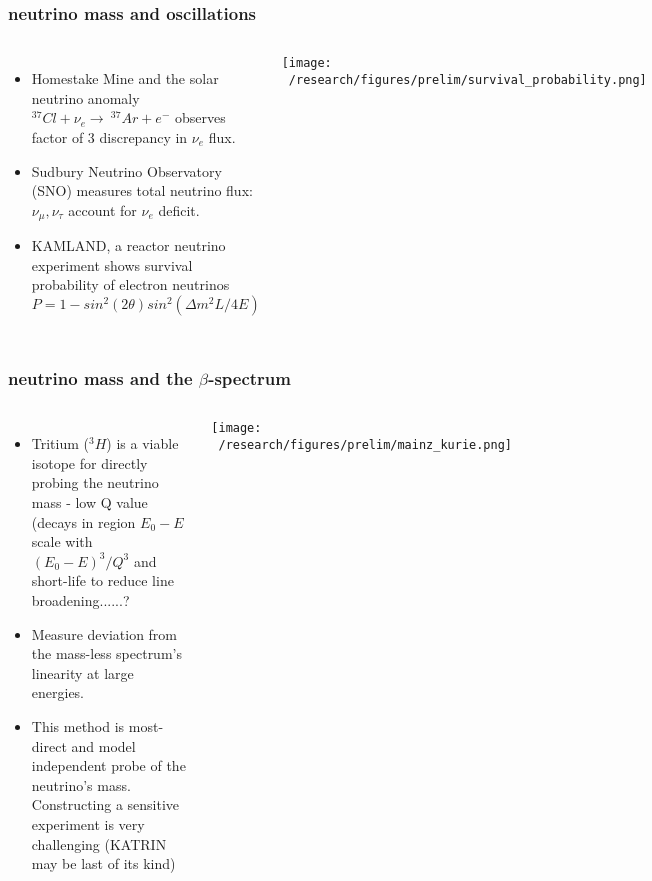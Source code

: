 \documentclass{beamer}
\begin{document}
	\begin{frame}
		\frametitle{neutrino mass and oscillations}
		\begin{columns}[c] %
			
			\begin{itemize}
				\setlength\itemsep{2em}
				\item Homestake Mine and the solar neutrino anomaly $^{37}Cl+\nu_e \rightarrow \ ^{37}Ar + e^-$ observes factor of 3 discrepancy in $\nu_e$ flux.
				\item Sudbury Neutrino Observatory (SNO) measures total neutrino flux: $\nu_{\mu}, \nu_{\tau}$ account for $\nu_e$ deficit.
				\item KAMLAND, a reactor neutrino experiment shows survival probability of electron neutrinos $P = 1 - sin^2 (2\theta)sin^2(\Delta m^2 L \slash 4E)$
				
			\end{itemize}
			
			\texttt{[image: ~/research/figures/prelim/survival\_probability.png]}
		
			
		\end{columns}
	\end{frame}
	
	\begin{frame}
		\frametitle{neutrino mass and the $\beta$-spectrum}
		\begin{columns}[c] %
			
			\begin{itemize}
				\setlength\itemsep{2em}
				\item Tritium ($^3H$) is a viable isotope for directly probing the neutrino mass - low Q value (decays in region $E_0 - E$ scale with $(E_0-E)^3 / Q^3$  and short-life to reduce line broadening......?
				\item Measure deviation from the mass-less spectrum's linearity at large energies.
				\item This method is most-direct and model independent probe of the neutrino's mass. Constructing a sensitive experiment is very challenging (KATRIN may be last of its kind)
				
			\end{itemize}
			
			\texttt{[image: ~/research/figures/prelim/mainz\_kurie.png]}
		
			
		\end{columns}
	\end{frame}
	
\end{document}
